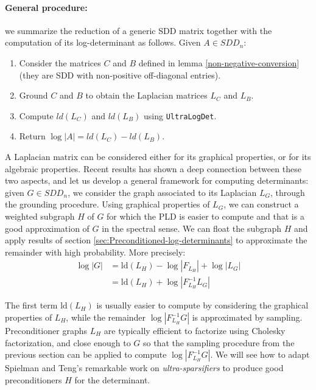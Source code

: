 \paragraph{General procedure:}

we summarize the reduction of a generic SDD matrix together with the
computation of its log-determinant as follows. Given $A\in SDD_{n}$: 
\begin{enumerate}
\item Consider the matrices $C$ and $B$ defined in lemma \ref{non-negative-conversion}
(they are SDD with non-positive off-diagonal entries). 
\item Ground $C$ and $B$ to obtain the Laplacian matrices $L_{C}$ and
$L_{B}$. 
\item Compute $ld(L_{C})$ and $ld(L_{B})$ using \texttt{UltraLogDet}. 
\item Return $\log|A|=ld(L_{C})-ld(L_{B})$. 
\end{enumerate}
A Laplacian matrix can be considered either for its graphical properties,
or for its algebraic properties. Recent results has shown a deep connection
between these two aspects, and let us develop a general framework
for computing determinants: given $G\in SDD_{n}$, we consider the
graph associated to its Laplacian $L_{G}$, through the grounding
procedure. Using graphical properties of $L_{G}$, we can construct
a weighted subgraph $H$ of $G$ for which the PLD is easier to compute
and that is a good approximation of $G$ in the spectral sense. We
can float the subgraph $H$ and apply results of section \ref{sec:Preconditioned-log-determinants}
to approximate the remainder with high probability. More precisely:
\begin{align*}
\log\left|G\right| & =\text{ld}\left(L_{H}\right)-\log\left|F_{L_{H}}\right|+\log\left|L_{G}\right|\\
 & =\text{ld}\left(L_{H}\right)+\log\left|F_{L_{H}}^{-1}L_{G}\right|
\end{align*}


The first term $\text{ld}\left(L_{H}\right)$ is usually easier to
compute by considering the graphical properties of $L_{H}$, while
the remainder $\log\left|F_{L_{H}}^{-1}G\right|$ is approximated
by sampling. Preconditioner graphs $L_{H}$ are typically efficient
to factorize using Cholesky factorization, and close enough to $G$
so that the sampling procedure from the previous section can be applied
to compute $\log\left|F_{L_{H}}^{-1}G\right|$. We will see how to
adapt Spielman and Teng's remarkable work on \emph{ultra-sparsifiers}
to produce good preconditioners $H$ for the determinant.

